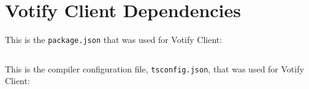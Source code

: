 \clearpage
\section{Votify Client Dependencies}
This is the \texttt{package.json} that was used for Votify Client:
\inputminted{json}{code/client.package.json}
\clearpage
This is the \ts{} compiler configuration file, \texttt{tsconfig.json}, that was used for Votify
Client:
\inputminted{json}{code/client.tsconfig.json}


